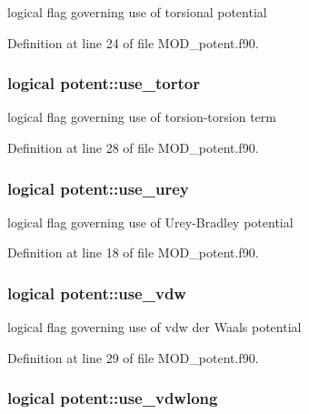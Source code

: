 logical flag governing use of torsional potential 



Definition at line 24 of file M\-O\-D\-\_\-potent.\-f90.

\hypertarget{classpotent_ac4ebdce0af0c3ba163b8862cc3bb9fb9}{
\subsubsection[{use\-\_\-tortor}]{\setlength{\rightskip}{0pt plus 5cm}logical potent\-::use\-\_\-tortor}}\label{classpotent_ac4ebdce0af0c3ba163b8862cc3bb9fb9}


logical flag governing use of torsion-\/torsion term 



Definition at line 28 of file M\-O\-D\-\_\-potent.\-f90.

\hypertarget{classpotent_a18c9c260e77b68f309216aad1b51e04e}{
\subsubsection[{use\-\_\-urey}]{\setlength{\rightskip}{0pt plus 5cm}logical potent\-::use\-\_\-urey}}\label{classpotent_a18c9c260e77b68f309216aad1b51e04e}


logical flag governing use of Urey-\/\-Bradley potential 



Definition at line 18 of file M\-O\-D\-\_\-potent.\-f90.

\hypertarget{classpotent_a1cba9006f347c796cd3d2be4eba3d5da}{
\subsubsection[{use\-\_\-vdw}]{\setlength{\rightskip}{0pt plus 5cm}logical potent\-::use\-\_\-vdw}}\label{classpotent_a1cba9006f347c796cd3d2be4eba3d5da}


logical flag governing use of vdw der Waals potential 



Definition at line 29 of file M\-O\-D\-\_\-potent.\-f90.

\hypertarget{classpotent_ab70fe3ec7b82b9065c25f4f051395663}{
\subsubsection[{use\-\_\-vdwlong}]{\setlength{\rightskip}{0pt plus 5cm}logical potent\-::use\-\_\-vdwlong}}\label{classpotent_ab70fe3ec7b82b9065c25f4f051395663}


